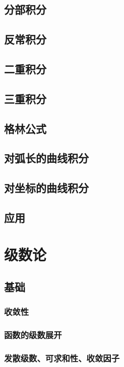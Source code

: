 \documentclass[UTF8]{../../09-Mathematics}
\begin{document}
\section{分部积分}
\section{反常积分}

\section{二重积分}
\section{三重积分}

\section{格林公式}
\section{对弧长的曲线积分}
\section{对坐标的曲线积分}


\section{应用}




\chapter{级数论}

\section{基础}



\subsection{收敛性}
\subsection{函数的级数展开}

\subsection{发散级数、可求和性、收敛因子}
\end{document}
